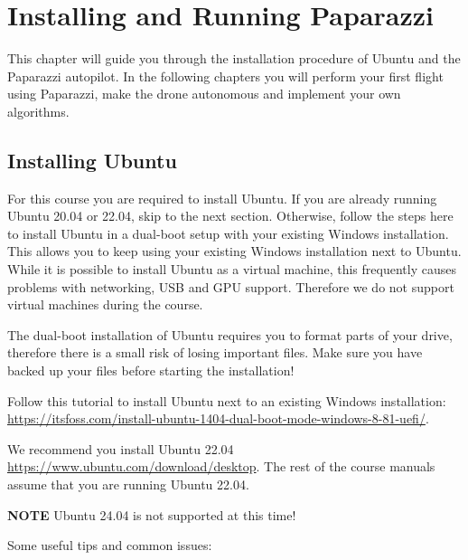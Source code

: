 \chapter{Installing and Running Paparazzi}
This chapter will guide you through the installation procedure of Ubuntu and the Paparazzi autopilot.
In the following chapters you will perform your first flight using Paparazzi, make the drone autonomous and implement your own algorithms.

\section{Installing Ubuntu}
For this course you are required to install Ubuntu.
If you are already running Ubuntu 20.04 or 22.04, skip to the next section.
Otherwise, follow the steps here to install Ubuntu in a dual-boot setup with your existing Windows installation.
This allows you to keep using your existing Windows installation next to Ubuntu.
While it is possible to install Ubuntu as a virtual machine, this frequently causes problems with networking, USB and GPU support. Therefore we do not support virtual machines during the course.

The dual-boot installation of Ubuntu requires you to format parts of your drive, therefore there is a small risk of losing important files.
Make sure you have backed up your files before starting the installation!

Follow this tutorial to install Ubuntu next to an existing Windows installation: \url{https://itsfoss.com/install-ubuntu-1404-dual-boot-mode-windows-8-81-uefi/}. 

We recommend you install Ubuntu 22.04 \url{https://www.ubuntu.com/download/desktop}. The rest of the course manuals assume that you are running Ubuntu 22.04. 

\textbf{NOTE} Ubuntu 24.04 is not supported at this time!

Some useful tips and common issues:


